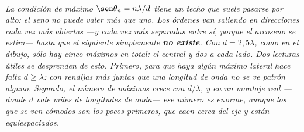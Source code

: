 \begin{center}
\\[0.5em]
{\small\itshape La condición de máximo $\sen\theta_n = n\lambda/d$ tiene un
techo que suele pasarse por alto: el seno no puede valer más que uno. Los
órdenes van saliendo en direcciones cada vez más abiertas ---y cada vez más
separadas entre sí, porque el arcoseno se estira--- hasta que el siguiente
simplemente \textbf{no existe}. Con $d = 2{,}5\lambda$, como en el dibujo, sólo
hay cinco máximos en total: el central y dos a cada lado. Dos lecturas útiles se
desprenden de esto. Primero, para que haya \emph{algún} máximo lateral hace
falta $d \ge \lambda$: con rendijas más juntas que una longitud de onda no se ve
patrón alguno. Segundo, el número de máximos crece con $d/\lambda$, y en un
montaje real ---donde $d$ vale miles de longitudes de onda--- ese número es
enorme, aunque los que se ven cómodos son los pocos primeros, que caen cerca del
eje y están equiespaciados.}
\end{center}
